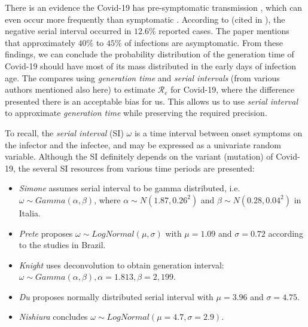 \documentclass[
  digital, %
  oneside, %
  lof,     %
  lot,     %
]{fithesis4}
\begin{document}
There is an evidence the Covid-19 has pre-symptomatic transmission \cite{ma2020}, which can even occur more frequently than symptomatic \cite{nishiura2020}.
According to \cite{du2020} (cited in \cite{knight2020}), the negative serial interval occurred in $12.6\%$ reported cases.
The paper \cite{oran2020} mentions that approximately $40\%$ to $45\%$ of infections are asymptomatic.
From these findings, we can conclude the probability distribution of the generation time of Covid-19 should have most of its mass distributed in the early days of infection age.
The \cite{knight2020} compares using \textit{generation time} and \textit{serial intervals} (from various authors mentioned also here) to estimate $\mathcal{R}_e$ for Covid-19, where the difference presented there is an acceptable bias for us.
This allows us to use \textit{serial interval} to approximate \textit{generation time} while preserving the required precision.

To recall, the \textit{serial interval} (SI) $\omega$ is a time interval between onset symptoms on the infector and the infectee, and may be expressed as a univariate random variable. 
Although the SI definitely depends on the variant (mutation) of Covid-19, the several SI resources from various time periods are presented:

\begin{itemize}
  \item \textit{Simone} \cite{simone2020} assumes serial interval to be gamma 
  distributed, i.e. $\omega \sim Gamma(\alpha,\beta)$, where 
  $\alpha \sim N \left( 1.87, 0.26^2 \right)$ and 
  $\beta \sim N \left( 0.28, 0.04^2 \right)$ in Italia.

  \item \textit{Prete} \cite{prete2020} proposes $\omega \sim LogNormal(\mu, \sigma)$ 
  with $\mu = 1.09$ and $\sigma = 0.72$ according to the 
  studies in Brazil.

  \item \textit{Knight} \cite{knight2020} uses deconvolution 
  to obtain generation interval: $\omega \sim Gamma(\alpha, \beta), \alpha = 1.813, \beta = 2,199$.

  \item \textit{Du} \cite{du2020} proposes normally distributed serial 
  interval with $\mu = 3.96$ and $\sigma = 4.75$.

  \item \textit{Nishiura} \cite{nishiura2020} concludes 
  $\omega \sim LogNormal \left( \mu = 4.7, \sigma = 2.9 \right)$.
\end{itemize}
\end{document}
